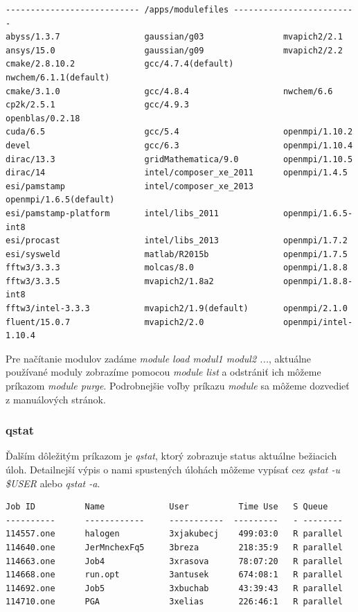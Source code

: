 \begin{lstlisting}[caption={module avail}]
--------------------------- /apps/modulefiles -------------------------
abyss/1.3.7                 gaussian/g03                mvapich2/2.1
ansys/15.0                  gaussian/g09                mvapich2/2.2
cmake/2.8.10.2              gcc/4.7.4(default)          nwchem/6.1.1(default)
cmake/3.1.0                 gcc/4.8.4                   nwchem/6.6
cp2k/2.5.1                  gcc/4.9.3                   openblas/0.2.18
cuda/6.5                    gcc/5.4                     openmpi/1.10.2
devel                       gcc/6.3                     openmpi/1.10.4
dirac/13.3                  gridMathematica/9.0         openmpi/1.10.5
dirac/14                    intel/composer_xe_2011      openmpi/1.4.5
esi/pamstamp                intel/composer_xe_2013      openmpi/1.6.5(default)
esi/pamstamp-platform       intel/libs_2011             openmpi/1.6.5-int8
esi/procast                 intel/libs_2013             openmpi/1.7.2
esi/sysweld                 matlab/R2015b               openmpi/1.7.5
fftw3/3.3.3                 molcas/8.0                  openmpi/1.8.8
fftw3/3.3.5                 mvapich2/1.8a2              openmpi/1.8.8-int8
fftw3/intel-3.3.3           mvapich2/1.9(default)       openmpi/2.1.0
fluent/15.0.7               mvapich2/2.0                openmpi/intel-1.10.4
\end{lstlisting}

Pre načítanie modulov zadáme \textit{module load modul1 modul2 ...}, aktuálne používané moduly zobrazíme pomocou
\textit{module list} a odstrániť ich môžeme príkazom \textit{module purge}.
Podrobnejšie voľby príkazu \textit{module} sa môžeme dozvedieť z manuálových stránok.

\subsubsection{qstat}
Ďalším dôležitým príkazom je \textit{qstat}, ktorý zobrazuje status aktuálne bežiacich úloh.
Detailnejší výpis o nami spustených úlohách môžeme vypísať cez \textit{qstat -u \$USER} alebo \textit{qstat -a}.
\begin{lstlisting}[caption={qstat}]
Job ID          Name             User          Time Use   S Queue
----------      ------------     -----------  ---------   - --------
114557.one      halogen          3xjakubecj    499:03:0   R parallel
114640.one      JerMnchexFq5     3breza        218:35:9   R parallel
114663.one      Job4             3xrasova      78:07:20   R parallel
114668.one      run.opt          3antusek      674:08:1   R parallel
114692.one      Job5             3xbuchab      43:39:43   R parallel
114710.one      PGA              3xelias       226:46:1   R parallel
\end{lstlisting}

